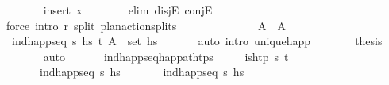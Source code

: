 \begin{isabellebody}
\ \ \ \ \ \ \isamarkupfalse%
\ {\isacharparenleft}{\kern0pt}insert\ x{\isacharparenright}{\kern0pt}\isanewline
\ \ \ \ \ \ \isamarkupfalse%
\ {\isacharparenleft}{\kern0pt}elim\ disjE\ conjE{\isacharparenright}{\kern0pt}\isanewline
\ \ \ \ \ \ \isamarkupfalse%
\ {\isacharparenleft}{\kern0pt}force\ intro{\isacharcolon}{\kern0pt}\ r\ split{\isacharcolon}{\kern0pt}\ plan{\isacharunderscore}{\kern0pt}action{\isachardot}{\kern0pt}splits{\isacharparenright}{\kern0pt}{\isacharplus}{\kern0pt}\isanewline
\ \ \ \ \ \ \isanewline
\ \ \ \ \isamarkupfalse%
\ \isamarkupfalse%
\ {\isachardoublequoteopen}A{\isacharprime}{\kern0pt}{\isacharprime}{\kern0pt}\ {\isacharequal}{\kern0pt}\ A{\isacharprime}{\kern0pt}{\isachardoublequoteclose}\isanewline
\ \ \ \ \ \ \isamarkupfalse%
\ \ {\isacartoucheopen}ind{\isacharunderscore}{\kern0pt}happ{\isacharunderscore}{\kern0pt}seq\ {\isasympi}s\ hs{\isacharprime}{\kern0pt}{\isacartoucheclose}\ {\isacartoucheopen}{\isacharparenleft}{\kern0pt}t{\isacharcomma}{\kern0pt}\ A{\isacharprime}{\kern0pt}{\isacharparenright}{\kern0pt}\ {\isasymin}\ set\ hs{\isacharprime}{\kern0pt}{\isacartoucheclose}\isanewline
\ \ \ \ \ \ \isamarkupfalse%
{\isacharparenleft}{\kern0pt}auto\ intro{\isacharcolon}{\kern0pt}\ unique{\isacharunderscore}{\kern0pt}happ{\isacharparenright}{\kern0pt}\isanewline
\ \ \ \ \isamarkupfalse%
\ \isamarkupfalse%
\ {\isacharquery}{\kern0pt}thesis\isanewline
\ \ \ \ \ \ \isamarkupfalse%
\ auto\isanewline
\ \ \isamarkupfalse%
%
\endisatagproof
{\isafoldproof}%
%
\isadelimproof
\isanewline
%
\endisadelimproof
\isanewline
\ \ \isamarkupfalse%
\ ind{\isacharunderscore}{\kern0pt}happ{\isacharunderscore}{\kern0pt}seq{\isacharunderscore}{\kern0pt}happ{\isacharunderscore}{\kern0pt}at{\isacharunderscore}{\kern0pt}htps{\isacharprime}{\kern0pt}{\isacharcolon}{\kern0pt}\isanewline
\ \ \ \ \ {\isachardoublequoteopen}is{\isacharunderscore}{\kern0pt}htp\ {\isasympi}s\ t{\isachardoublequoteclose}\isanewline
\ \ \ \ \ \ \ {\isachardoublequoteopen}ind{\isacharunderscore}{\kern0pt}happ{\isacharunderscore}{\kern0pt}seq\ {\isasympi}s\ hs{\isachardoublequoteclose}\isanewline
\ \ \ \ \ \ \ {\isachardoublequoteopen}ind{\isacharunderscore}{\kern0pt}happ{\isacharunderscore}{\kern0pt}seq\ {\isasympi}s\ hs{\isacharprime}{\kern0pt}{\isachardoublequoteclose}\isanewline

\end{isabellebody}
